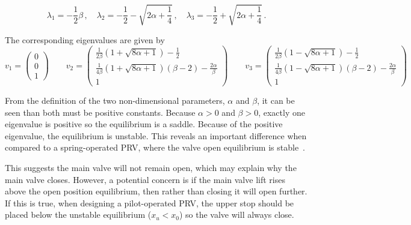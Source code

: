 \begin{equation*}
\lambda_1 = - \frac{1}{2} \beta \, , \quad
\lambda_2 = - \frac{1}{2} - \sqrt{2 \alpha + \frac{1}{4}} \, , \quad \lambda_3 = - \frac{1}{2} + \sqrt{2 \alpha + \frac{1}{4}} \, .
\end{equation*}

The corresponding eigenvalues are given by
~
\begin{equation*}
    v_1 = \begin{pmatrix}
    0 \\ 0 \\ 1
    \end{pmatrix} \qquad
    v_2 = \begin{pmatrix}
    \frac{1}{2\beta} \left( 1 + \sqrt{8\alpha+1} \right) - \frac{1}{2} \\ \frac{1}{4\beta} \left( 1 + \sqrt{8\alpha+1} \right) \left( \beta - 2 \right) - \frac{2\alpha}{\beta} \\ 1
    \end{pmatrix} \qquad
    v_3 = \begin{pmatrix}
    \frac{1}{2\beta} \left( 1 - \sqrt{8\alpha+1} \right) - \frac{1}{2} \\ \frac{1}{4\beta} \left( 1 - \sqrt{8\alpha+1} \right) \left( \beta - 2 \right) - \frac{2\alpha}{\beta} \\ 1
    \end{pmatrix}
\end{equation*}

From the definition of the two non-dimensional parameters, $\alpha$ and $\beta$, it can be seen than both must be positive constants. Because $\alpha > 0$ and $\beta > 0$, exactly one eigenvalue is positive so the equilibrium is a saddle. Because of the positive eigenvalue, the equilibrium is unstable. This reveals an important difference when compared to a spring-operated PRV, where the valve open equilibrium is stable~\cite{Hos2014DynamicMechanisms}.

This suggests the main valve will not remain open, which may explain why the main valve closes. However, a potential concern is if the main valve lift rises above the open position equilibrium, then rather than closing it will open further. If this is true, when designing a pilot-operated PRV, the upper stop should be placed below the unstable equilibrium ($x_u < x_0$) so the valve will always close. %

